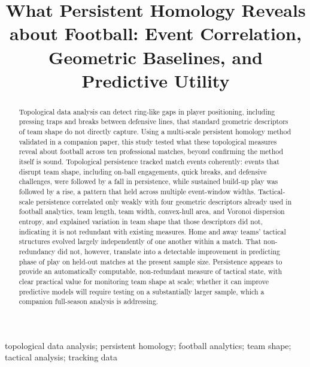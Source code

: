 \documentclass[]{interact}
\begin{document}

\title{What Persistent Homology Reveals about Football: Event Correlation, Geometric Baselines, and Predictive Utility}

\author{
}

\maketitle

\begin{abstract}
Topological data analysis can detect ring-like gaps in player positioning, including pressing traps and breaks between defensive lines, that standard geometric
descriptors of team shape do not directly capture. Using a multi-scale
persistent homology method validated in a companion paper, this study
tested what these topological measures reveal about football across ten
professional matches, beyond confirming the method itself is sound.
Topological persistence tracked match events coherently: events that
disrupt team shape, including on-ball engagements, quick breaks, and defensive challenges, were followed by a fall in persistence, while sustained
build-up play was followed by a rise, a pattern that held across multiple
event-window widths. Tactical-scale persistence correlated only weakly
with four geometric descriptors already used in football analytics, team length, team width, convex-hull area, and Voronoi dispersion entropy, and explained variation in team shape that those descriptors did not,
indicating it is not redundant with existing measures. Home and away
teams' tactical structures evolved largely independently of one another
within a match. That non-redundancy did not, however, translate into a
detectable improvement in predicting phase of play on held-out matches at
the present sample size. Persistence appears to provide an automatically
computable, non-redundant measure of tactical state, with clear practical
value for monitoring team shape at scale; whether it can improve
predictive models will require testing on a substantially larger sample,
which a companion full-season analysis is addressing.
\end{abstract}

\begin{keywords}
topological data analysis; persistent homology; football analytics; team shape; tactical analysis; tracking data
\end{keywords}










\end{document}
